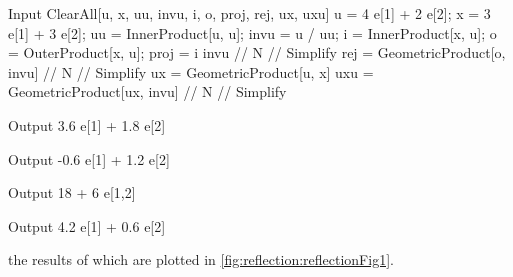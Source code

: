 \begin{mmaCell}[moredefined={u, x, uu, invu, i, o, proj, rej, ux, uxu, e, InnerProduct, OuterProduct, GeometricProduct}]{Input}
  ClearAll[u, x, uu, invu, i, o, proj, rej, ux, uxu]
  u = 4 e[1] + 2 e[2];
  x = 3 e[1] + 3 e[2];
  uu = InnerProduct[u, u];
  invu = u / uu;
  i = InnerProduct[x, u];
  o = OuterProduct[x, u];
  proj = i invu // N // Simplify
  rej = GeometricProduct[o, invu] // N // Simplify
  ux = GeometricProduct[u, x]
  uxu = GeometricProduct[ux, invu] // N // Simplify
\end{mmaCell}
\begin{mmaCell}{Output}
  3.6 e[1] + 1.8 e[2]
\end{mmaCell}
\begin{mmaCell}{Output}
  -0.6 e[1] + 1.2 e[2]
\end{mmaCell}
\begin{mmaCell}{Output}
  18 + 6 e[1,2]
\end{mmaCell}
\begin{mmaCell}{Output}
  4.2 e[1] + 0.6 e[2]
\end{mmaCell}

the results of which are plotted in \cref{fig:reflection:reflectionFig1}.

